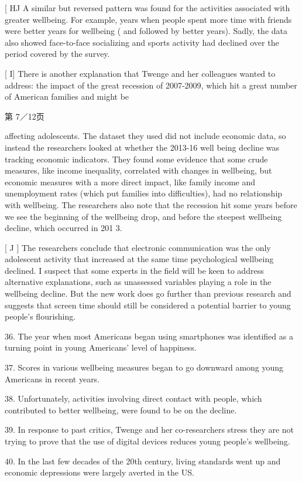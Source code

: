 \documentclass[UTF8,11pt]{ctexart}
\begin{document}
[ HJ A similar but reversed pattern was found for the activities associated with greater wellbeing. For example, years when people spent more time with friends were better years for wellbeing ( and followed by better years). Sadly, the data also showed face-to-face socializing and sports activity had declined over the period covered by the survey.


[ I] There is another explanation that Twenge and her colleagues wanted to address: the impact of the great recession of 2007-2009, which hit a great number of American families and might be


第 7／12页


affecting adolescents. The dataset they used did not include economic data, so instead the researchers looked at whether the 2013-16 well being decline was tracking economic indicators. They found some evidence that some crude measures, like income inequality, correlated with changes in wellbeing, but economic measures with a more direct impact, like family income and unemployment rates (which put families into difficulties), had no relationship with wellbeing. The researchers also note that the recession hit some years before we see the beginning of the wellbeing drop, and before the steepest wellbeing decline, which occurred in 201 3.


[ J ] The researchers conclude that electronic communication was the only adolescent activity that increased at the same time psychological wellbeing declined. I suspect that some experts in the field will be keen to address alternative explanations, such as unassessed variables playing a role in the wellbeing decline. But the new work does go further than previous research and suggests that screen time should still be considered a potential barrier to young people's flourishing.


36. The year when most Americans began using smartphones was identified as a turning point in young Americans' level of happiness.


37. Scores in various wellbeing measures began to go downward among young Americans in recent years.


38. Unfortunately, activities involving direct contact with people, which contributed to better wellbeing, were found to be on the decline.


39. In response to past critics, Twenge and her co-researchers stress they are not trying to prove that the use of digital devices reduces young people's wellbeing.


40. In the last few decades of the 20th century, living standards went up and economic depressions were largely averted in the US.
\end{document}
